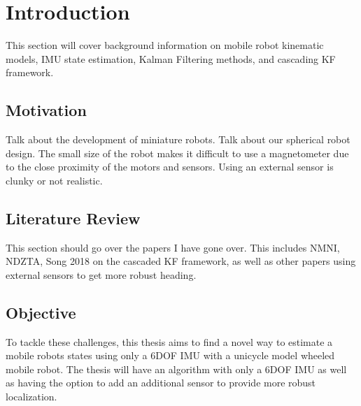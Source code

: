 \chapter{Introduction}		%
\label{introchap}		%

This section will cover background information on mobile robot kinematic models,
IMU state estimation, Kalman Filtering methods, and cascading KF framework. 


\section{Motivation}

Talk about the development of miniature robots. Talk about our spherical robot design.
The small size of the robot makes it difficult to use a magnetometer due to the close
proximity of the motors and sensors. Using an external sensor is clunky or not
realistic. 

\section{Literature Review}

This section should go over the papers I have gone over. This includes NMNI, NDZTA, 
Song 2018 on the cascaded KF framework, as well as other papers using external 
sensors to get more robust heading. 

\section{Objective}

To tackle these challenges, this thesis aims to find a novel way to estimate
a mobile robots states using only a 6DOF IMU with a unicycle model wheeled mobile 
robot. The thesis will have an algorithm with only a 6DOF IMU as well as having the
option to add an additional sensor to provide more robust localization.


